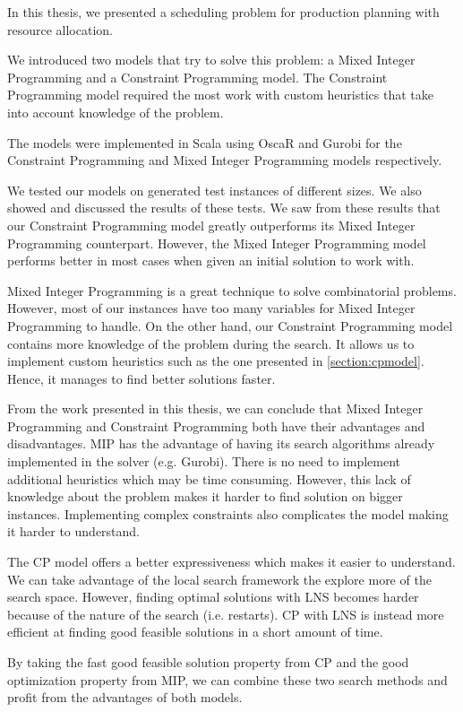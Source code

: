 \documentclass[../thesis.tex]{subfiles}
\begin{document}
In this thesis, we presented a scheduling problem for production planning 
with resource allocation.

We introduced two models that try to solve
this problem: a Mixed Integer Programming and a Constraint Programming model.
The Constraint Programming model required the most work with custom heuristics that take into account knowledge of the problem.

The models were implemented in Scala using OscaR and Gurobi for the Constraint Programming and Mixed Integer Programming models respectively.

We tested our models on generated test instances of different sizes.
We also showed and discussed the results of these tests. We saw from these results that our Constraint Programming model greatly outperforms
its Mixed Integer Programming counterpart.
However, the Mixed Integer Programming model performs better in most cases when given an initial solution 
to work with.


Mixed Integer Programming is a great technique to solve combinatorial problems. However, most of our 
instances have too many variables for Mixed Integer Programming to handle.
On the other hand,
our Constraint Programming model contains more knowledge of the problem during the search. 
It allows us to implement custom heuristics such as the one presented in \autoref{section:cpmodel}. Hence, it manages to find 
better solutions faster. 

From the work presented in this thesis, we can conclude that Mixed Integer Programming and Constraint Programming both have their advantages and disadvantages.
MIP has the advantage of having its search algorithms already implemented in the solver (e.g. Gurobi). There is no need 
to implement additional heuristics which may be time consuming. However, this lack of knowledge about the problem makes 
it harder to find solution on bigger instances. Implementing complex constraints also complicates the model making it harder to understand. 

The CP model offers a better expressiveness which makes it easier to understand. We can take advantage of the local search 
framework the explore more of the search space. However, finding optimal solutions with LNS becomes harder because of 
the nature of the search (i.e. restarts). CP with LNS is instead more efficient at finding good feasible solutions in a 
short amount of time.

By taking the fast good feasible solution property from CP and the good optimization property from MIP, we can combine these two 
search methods and profit from the advantages of both models.
\end{document}
